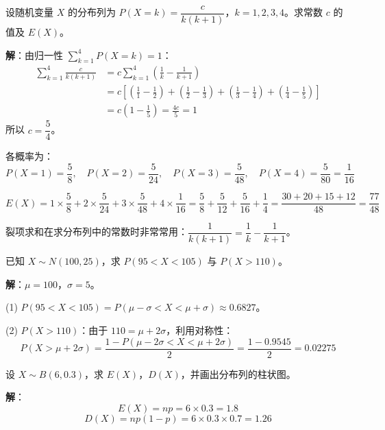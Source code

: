 \documentclass[12pt, a4paper]{ctexart}
\begin{document}
\begin{examplebox}[【例3】分布列的性质应用]
设随机变量 $X$ 的分布列为 $P(X = k) = \dfrac{c}{k(k+1)}$，$k = 1, 2, 3, 4$。求常数 $c$ 的值及 $E(X)$。
\end{examplebox}

\textbf{解}：由归一性 $\displaystyle\sum_{k=1}^{4} P(X=k) = 1$：
\begin{align*}
\sum_{k=1}^{4} \frac{c}{k(k+1)} &= c\sum_{k=1}^{4}\left(\frac{1}{k} - \frac{1}{k+1}\right) \\
&= c\left[\left(\frac{1}{1} - \frac{1}{2}\right) + \left(\frac{1}{2} - \frac{1}{3}\right) + \left(\frac{1}{3} - \frac{1}{4}\right) + \left(\frac{1}{4} - \frac{1}{5}\right)\right] \\
&= c\left(1 - \frac{1}{5}\right) = \frac{4c}{5} = 1
\end{align*}
所以 $c = \dfrac{5}{4}$。

各概率为：
\[
P(X=1) = \frac{5}{8},\quad P(X=2) = \frac{5}{24},\quad P(X=3) = \frac{5}{48},\quad P(X=4) = \frac{5}{80} = \frac{1}{16}
\]

\[
E(X) = 1 \times \frac{5}{8} + 2 \times \frac{5}{24} + 3 \times \frac{5}{48} + 4 \times \frac{1}{16}
= \frac{5}{8} + \frac{5}{12} + \frac{5}{16} + \frac{1}{4}
= \frac{30 + 20 + 15 + 12}{48} = \frac{77}{48}
\]

\begin{tipbox}[方法总结]
裂项求和在求分布列中的常数时非常常用：$\dfrac{1}{k(k+1)} = \dfrac{1}{k} - \dfrac{1}{k+1}$。
\end{tipbox}

\begin{examplebox}[【例4】正态分布的区间概率]
已知 $X \sim N(100, 25)$，求 $P(95 < X < 105)$ 与 $P(X > 110)$。
\end{examplebox}

\textbf{解}：$\mu = 100$，$\sigma = 5$。

(1) $P(95 < X < 105) = P(\mu - \sigma < X < \mu + \sigma) \approx 0.6827$。

(2) $P(X > 110)$：由于 $110 = \mu + 2\sigma$，利用对称性：
\[
P(X > \mu + 2\sigma) = \frac{1 - P(\mu - 2\sigma < X < \mu + 2\sigma)}{2} = \frac{1 - 0.9545}{2} = 0.02275
\]

\begin{examplebox}[【例5】二项分布的期望方差及图像]
设 $X \sim B(6, 0.3)$，求 $E(X)$，$D(X)$，并画出分布列的柱状图。
\end{examplebox}

\textbf{解}：
\[
E(X) = np = 6 \times 0.3 = 1.8
\]
\[
D(X) = np(1-p) = 6 \times 0.3 \times 0.7 = 1.26
\]
\end{document}
